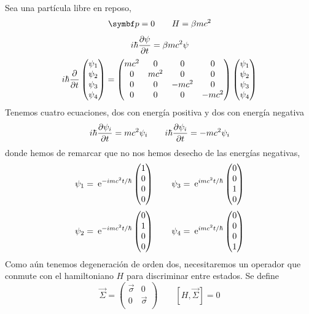 \documentclass[10pt,oneside]{CBFT_book}
\begin{document}
Sea una partícula libre en reposo,
\[
	\vb{p} = 0 \qquad H=\beta m c^2
\]
\[
	i \hbar \frac{\partial^{\hspace{-0.05em}} {\psi}}{\partial {t}^{\hspace{-0.05em}}} = \beta m c^2 \psi
\]
\[
	i \hbar \frac{\partial^{\hspace{-0.05em}} {}}{\partial {t}^{\hspace{-0.05em}}} \begin{pmatrix} \psi_1 \\ \psi_2 \\ \psi_3 \\ \psi_4  \end{pmatrix} =
	\begin{pmatrix}
	mc^2 & 0 & 0 & 0 \\ 
	0 & mc^2 & 0 & 0 \\ 
	0 & 0 & -mc^2 & 0 \\ 
	0 & 0 & 0 & -mc^2 
	\end{pmatrix}
	\begin{pmatrix}
	\psi_1 \\ 
	\psi_2 \\ 
	\psi_3 \\ 
	\psi_4  
	\end{pmatrix}
\]
Tenemos cuatro ecuaciones, dos con energía positiva y dos con energía negativa
\[
	i \hbar \frac{\partial^{\hspace{-0.05em}} {\psi_i}}{\partial {t}^{\hspace{-0.05em}}} = mc^2 \psi_i \qquad i \hbar \frac{\partial^{\hspace{-0.05em}} {\psi_i}}{\partial {t}^{\hspace{-0.05em}}} = -mc^2 \psi_i
\]
donde hemos de remarcar que no nos hemos desecho de las energías negativas,
\[
	\psi_1 = \:\mathrm{e}^{-imc^2t/\hbar}\begin{pmatrix} 1 \\ 0 \\ 0 \\ 0  \end{pmatrix} \qquad 
	\psi_3 = \:\mathrm{e}^{imc^2t/\hbar}\begin{pmatrix} 0 \\ 0 \\ 1 \\ 0  \end{pmatrix}
\]
\[
	\psi_2 = \:\mathrm{e}^{-imc^2t/\hbar}\begin{pmatrix} 0 \\ 1 \\ 0 \\ 0  \end{pmatrix} \qquad 
	\psi_4 = \:\mathrm{e}^{imc^2t/\hbar}\begin{pmatrix} 0 \\ 0 \\ 0 \\ 1  \end{pmatrix}
\]
Como aún tenemos degeneración de orden dos, necesitaremos un operador que conmute con el 
hamiltoniano $H$ para discriminar entre estados. Se define
\[
	\vec{\Sigma} = \begin{pmatrix} \vec{\sigma} & 0 \\ 0 & \vec{\sigma} \\ \end{pmatrix} \qquad 
	[H,\vec{\Sigma}] = 0
\]
\end{document}
